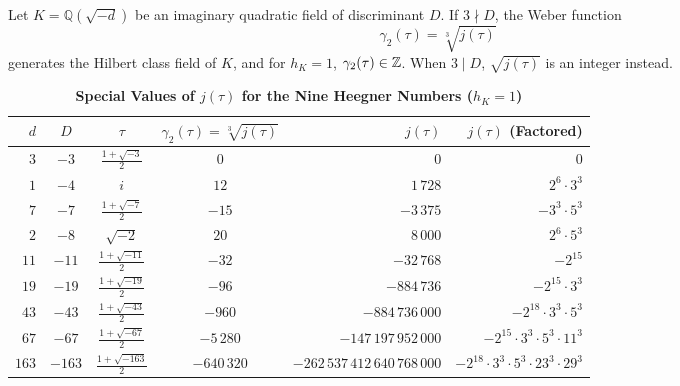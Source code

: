 \documentclass[a4paper]{article}
\begin{document}
\begin{theorem}
Let $K = \mathbb{Q}(\sqrt{-d})$ be an imaginary quadratic field of discriminant $D$. If $3 \nmid D$, the Weber function
\begin{equation}
 \gamma_2(\tau) = \sqrt[3]{j(\tau)}
\end{equation}
generates the Hilbert class field of $K$, and for $h_K = 1$, $\gamma_2(\tau) \in \mathbb{Z}$. When $3 \mid D$, $\sqrt{j(\tau)}$ is an integer instead.
\end{theorem}

\begin{table}[htbp]
\centering
\footnotesize
\setlength{\tabcolsep}{2.5pt}
\caption{\textbf{Special Values of $j(\tau)$ for the Nine Heegner Numbers ($h_K = 1$)}}
\label{tab:heegner_j}
\vspace{4pt}
\begin{tabular}{r c c c r r}
\toprule
$d$ & $D$ & $\tau$ & $\gamma_2(\tau) = \sqrt[3]{j(\tau)}$ & $j(\tau)$ & $j(\tau)$ (Factored) \\
\midrule
$3$ & $-3$ & $\frac{1+\sqrt{-3}}{2}$ & $0$ & $0$ & $0$ \\
$1$ & $-4$ & $i$ & $12$ & $1\,728$ & $2^6 \cdot 3^3$ \\
$7$ & $-7$ & $\frac{1+\sqrt{-7}}{2}$ & $-15$ & $-3\,375$ & $-3^3 \cdot 5^3$ \\
$2$ & $-8$ & $\sqrt{-2}$ & $20$ & $8\,000$ & $2^6 \cdot 5^3$ \\
$11$ & $-11$ & $\frac{1+\sqrt{-11}}{2}$ & $-32$ & $-32\,768$ & $-2^{15}$ \\
$19$ & $-19$ & $\frac{1+\sqrt{-19}}{2}$ & $-96$ & $-884\,736$ & $-2^{15} \cdot 3^3$ \\
$43$ & $-43$ & $\frac{1+\sqrt{-43}}{2}$ & $-960$ & $-884\,736\,000$ & $-2^{18} \cdot 3^3 \cdot 5^3$ \\
$67$ & $-67$ & $\frac{1+\sqrt{-67}}{2}$ & $-5\,280$ & $-147\,197\,952\,000$ & $-2^{15} \cdot 3^3 \cdot 5^3 \cdot 11^3$ \\
$163$ & $-163$ & $\frac{1+\sqrt{-163}}{2}$ & $-640\,320$ & $-262\,537\,412\,640\,768\,000$ & $-2^{18} \cdot 3^3 \cdot 5^3 \cdot 23^3 \cdot 29^3$ \\
\bottomrule
\end{tabular}
\end{table}
\end{document}
